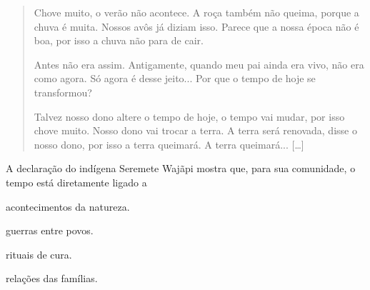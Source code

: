 \begin{quote}
Chove muito, o verão não acontece. A roça também não queima, porque a
chuva é muita. Nossos avôs já diziam isso. Parece que a nossa época não
é boa, por isso a chuva não para de cair.

Antes não era assim. Antigamente, quando meu pai ainda era vivo, não era
como agora. Só agora é desse jeito... Por que o tempo de hoje se
transformou?

Talvez nosso dono altere o tempo de hoje, o tempo vai mudar, por isso
chove muito. Nosso dono vai trocar a terra. A terra será renovada, disse
o nosso dono, por isso a terra queimará. A terra queimará... {[}\ldots{}{]}

\end{quote}

A declaração do indígena Seremete Wajãpi mostra que, para sua comunidade, o tempo está diretamente ligado a

\begin{minipage}{.5\textwidth}
\begin{escolha}
\item acontecimentos da natureza.

\item guerras entre povos.

\item rituais de cura.

\item relações das famílias.
\end{escolha}
\end{minipage}


